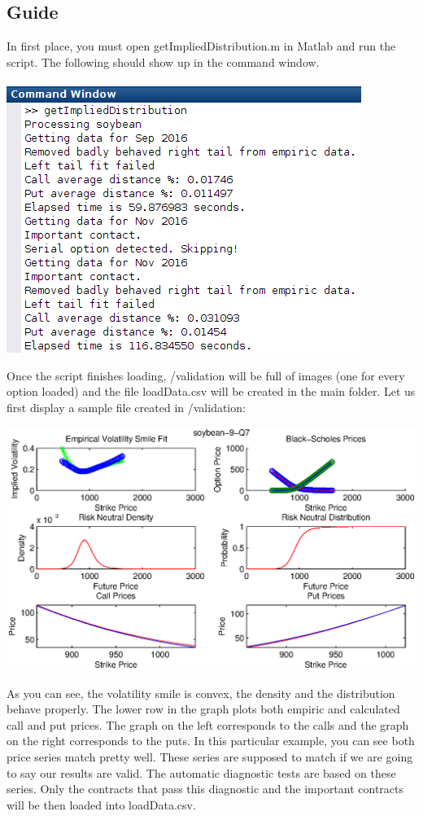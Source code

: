 \documentclass[10pt,a4paper]{book}
\begin{document}
\subsection{Guide}
In first place, you must open getImpliedDistribution.m in Matlab and run the script. The following should show up in the command window.
\\ \\
\includegraphics[scale=0.6]{images/commandWindow}

Once the script finishes loading, /validation will be full of images (one for every option loaded) and the file loadData.csv will be created in the main folder. Let us first display a sample file created in /validation:

\begin{center}
  \includegraphics[scale=0.75]{images/visualValidation}
\end{center}

As you can see, the volatility smile is convex, the density and the distribution behave properly. The lower row in the graph plots both empiric and calculated call and put prices. The graph on the left corresponds to the calls and the graph on the right corresponds to the puts. In this particular example, you can see both price series match pretty well. These series are supposed to match if we are going to say our results are valid. The automatic diagnostic tests are based on these series. Only the contracts that pass this diagnostic and the important contracts will be then loaded into loadData.csv.
\end{document}
